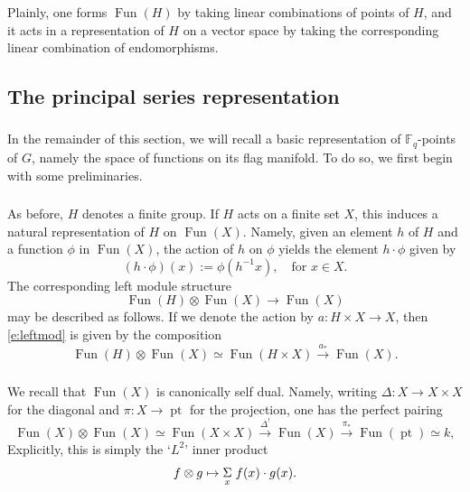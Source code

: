 \documentclass[10pt]{amsart}
\newcommand{\on}{\operatorname}
\newcommand{\Fun}{\on{Fun}}
\theoremstyle{remark}
\numberwithin{equation}{section}
\begin{document}
	Plainly, one forms $\Fun(H)$ by taking linear combinations of points of 
	$H$, and it acts in a representation of $H$ on a vector space by taking 
	the corresponding linear combination of endomorphisms. 
	
	
	\subsection{The principal series representation} 
	
	\subsubsection{} In the remainder of this section, we will recall a basic 
	representation of $\mathbb{F}_q$-points of $G$, namely the space of 
	functions on its flag manifold. To do so, we first begin with some 
	preliminaries. 
	
	
	
	\subsubsection{}  \label{ex:actspace}As before, $H$ denotes a finite group. 
	If $H$ acts on a finite set $X$, this induces a natural representation of 
	$H$ on $\Fun(X)$. Namely, given an element $h$ of $H$ and a function $\phi$ 
	in $\Fun(X)$, the action of $h$ on $\phi$ yields the element $h \cdot \phi$ 
	given by
	\[
	(h \cdot \phi)(x) := \phi(h^{-1} x), \quad \text{for } x \in X. 
	\]
	The corresponding left module structure 
	\begin{equation} \label{e:leftmod}
	\Fun(H) \otimes \Fun(X) \rightarrow \Fun(X)
	\end{equation}
	may be described as follows. If we denote the action by $a: H \times X 
	\rightarrow X$, then \eqref{e:leftmod} is given by the composition 
	\begin{equation} \label{e:actionfun}
	\Fun(H) \otimes \Fun(X) \simeq \Fun(H \times X) \xrightarrow{a_*} \Fun(X). 
	\end{equation}
	
	
	\subsubsection{}\label{s:funselfdual} We recall that $\Fun(X)$ is 
	canonically self dual. Namely, 
	writing $\Delta: X \rightarrow X \times X$ for the diagonal and $\pi: X 
	\rightarrow \on{pt}$ for the projection, one has the perfect pairing 
	\[
	\Fun(X) \otimes \Fun(X) \simeq \Fun(X \times X) \xrightarrow{\Delta^!} 
	\Fun(X) \xrightarrow{\pi_*} \Fun(\on{pt}) \simeq k,
	\]
	Explicitly, this is simply the `$L^2$' inner product 
	\[
	f \otimes g \mapsto \underset{x}{\Sigma} \hspace{1mm} f(x) \cdot g(x). 
	\]
	
\end{document}
